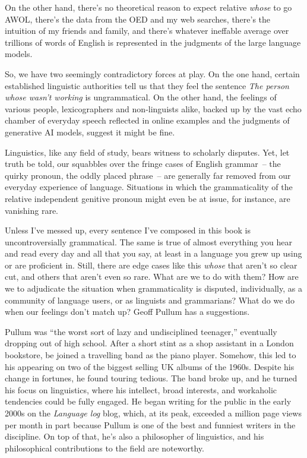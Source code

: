 On the other hand, there's no theoretical reason to expect relative \textit{whose} to go AWOL, there's the data from the OED and my web searches, there's the intuition of my friends and family, and there's whatever ineffable average over trillions of words of English is represented in the judgments of the large language models. 

So, we have two seemingly contradictory forces at play. On the one hand, certain established linguistic authorities tell us that they feel the sentence \textit{The person whose wasn't working} is ungrammatical. On the other hand, the feelings of various people, lexicographers and non-linguists alike, backed up by the vast echo chamber of everyday speech reflected in online examples and the judgments of generative AI models, suggest it might be fine.

\bigskip

Linguistics, like any field of study, bears witness to scholarly disputes. Yet, let truth be told, our squabbles over the fringe cases of English grammar~-- the quirky pronoun, the oddly placed phrase~-- are generally far removed from our everyday experience of language. Situations in which the grammaticality of the relative independent genitive pronoun might even be at issue, for instance, are vanishing rare.

Unless I've messed up, every sentence I've composed in this book is uncontroversially grammatical. The same is true of almost everything you hear and read every day and all that you say, at least in a language you grew up using or are proficient in. Still, there are edge cases like this \textit{whose} that aren't so clear cut, and others that aren't even so rare. What are we to do with them? How are we to adjudicate the situation when grammaticality is disputed, individually, as a community of language users, or as linguists and grammarians? What do we do when our feelings don't match up? Geoff Pullum has a suggestions.

Pullum was ``the worst sort of lazy and undisciplined teenager,'' eventually dropping out of high school. After a short stint as a shop assistant in a London bookstore, be joined a travelling band as the piano player. Somehow, this led to his appearing on two of the biggest selling UK albums of the 1960s. Despite his change in fortunes, he found touring tedious. The band broke up, and he turned his focus on linguistics, where his intellect, broad interests, and workaholic tendencies could be fully engaged. He began writing for the public in the early 2000s on the \textit{Language log} blog, which, at its peak, exceeded a million page views per month in part because Pullum is one of the best and funniest writers in the discipline. On top of that, he's also a philosopher of linguistics, and his philosophical contributions to the field are noteworthy.

